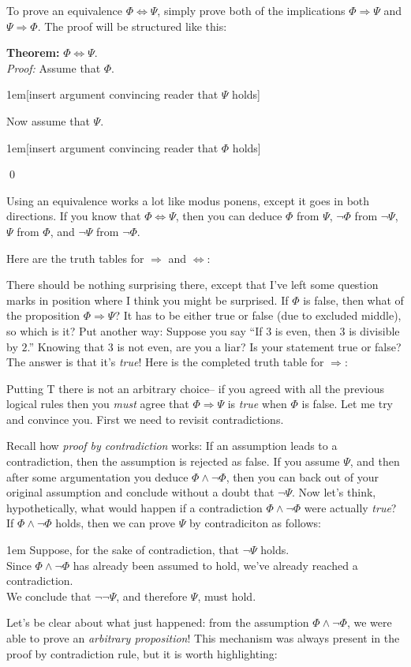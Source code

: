 \documentclass[12pt]{article}
\newcommand{\AND}{\wedge}
\newcommand{\ARR}{\Rightarrow}
\newcommand{\DARR}{\Leftrightarrow}
\newcommand{\indented}[1]{\begin{adjustwidth}{1em}{}#1\end{adjustwidth}}
\newcommand{\THM}[2]{\textbf{Theorem:} #1\\[0.5em]\textit{Proof:} #2\qed}
\def\pA{\Phi}
\def\pB{\Psi}
\begin{document}
To prove an equivalence $\pA\DARR\pB$, simply prove both of the implications $\pA\ARR\pB$ and $\pB\ARR\pA$.
The proof will be structured like this:

\THM{$\pA\DARR\pB$.}{
Assume that $\pA$.
\indented{[insert argument convincing reader that $\pB$ holds]}
Now assume that $\pB$.
\indented{[insert argument convincing reader that $\pA$ holds]}
}

Using an equivalence works a lot like modus ponens, except it goes in both directions.
If you know that $\pA\DARR\pB$, then you can deduce $\pA$ from $\pB$, $\neg\pA$ from $\neg\pB$,
$\pB$ from $\pA$, and $\neg\pB$ from $\neg\pA$.



\def\sp{\hspace{1em}}

Here are the truth tables for $\ARR$ and $\DARR$:
\begin{center}
\truthtablefour{$\pA\ARR\pB$}{???}{???}{F}{T}
\sp
\truthtablefour{$\pA\DARR\pB$}{T}{F}{F}{T}
\end{center}
There should be nothing surprising there, except that I've left some question marks in position where I think you might be surprised.
If $\pA$ is false, then what of the proposition $\pA\ARR\pB$?
It has to be either true or false (due to excluded middle), so which is it?
Put another way: Suppose you say ``If $3$ is even, then $3$ is divisible by $2$.''
Knowing that $3$ is not even, are you a liar? Is your statement true or false?
The answer is that it's \emph{true}!
Here is the completed truth table for $\ARR$:
\begin{center}
\truthtablefour{$\pA\ARR\pB$}{T}{T}{F}{T}
\end{center}
Putting T there is not an arbitrary choice-- if you agreed with all the previous logical rules then you \emph{must} agree
that $\pA\ARR\pB$ is \emph{true} when $\pA$ is false.
Let me try and convince you. First we need to revisit contradictions.


\def\vsp{\\[0.5em]}

Recall how \emph{proof by contradiction} works:
If an assumption leads to a contradiction, then the assumption is rejected as false.
If you assume $\pB$, and then after some argumentation you deduce $\pA\AND\neg\pA$, then
you can back out of your original assumption and conclude without a doubt that $\neg\pB$.
Now let's think, hypothetically, what would happen if a contradiction $\pA\AND\neg\pA$ were actually \emph{true}?
If $\pA\AND\neg\pA$ holds, then we can prove $\pB$ by contradiciton as follows:
\indented{
Suppose, for the sake of contradiction, that $\neg\pB$ holds.\vsp
Since $\pA\AND\neg\pA$ has already been assumed to hold, we've already reached a contradiction.\vsp
We conclude that $\neg\neg\pB$, and therefore $\pB$, must hold.
}
Let's be clear about what just happened: from the assumption $\pA\AND\neg\pA$, we were able to prove an \emph{arbitrary proposition}!
This mechanism was always present in the proof by contradiction rule, but it is worth highlighting:
\end{document}
